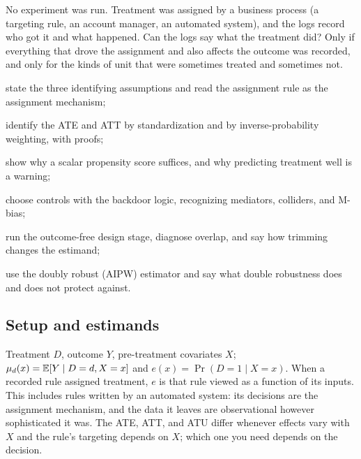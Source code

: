 \documentclass[11pt]{article}
\begin{document}

\begin{decision}
No experiment was run. Treatment was assigned by a business process (a targeting rule, an account manager, an automated
system), and the logs record who got it and what happened. Can the logs say what the treatment did? Only if everything
that drove the assignment and also affects the outcome was recorded, and only for the kinds of unit that were sometimes
treated and sometimes not.
\end{decision}

\begin{goals}
  \item state the three identifying assumptions and read the assignment rule as the assignment mechanism;
  \item identify the ATE and ATT by standardization and by inverse-probability weighting, with proofs;
  \item show why a scalar propensity score suffices, and why predicting treatment well is a warning;
  \item choose controls with the backdoor logic, recognizing mediators, colliders, and M-bias;
  \item run the outcome-free design stage, diagnose overlap, and say how trimming changes the estimand;
  \item use the doubly robust (AIPW) estimator and say what double robustness does and does not protect against.
\end{goals}

\sectionone

\subsection{Setup and estimands}

Treatment $D$, outcome $Y$, pre-treatment covariates $X$; $\mu_d(x) = \mathbb{E}[Y \mid D=d, X=x]$ and $e(x) = \Pr(D=1 \mid X=x)$. When a
recorded rule assigned treatment, $e$ is that rule viewed as a function of its inputs. This includes rules written by an
automated system: its decisions are the assignment mechanism, and the data it leaves are observational however sophisticated
it was. The ATE, ATT, and ATU differ whenever effects vary with $X$ and the rule's targeting depends on $X$; which one you
need depends on the decision.
\end{document}
